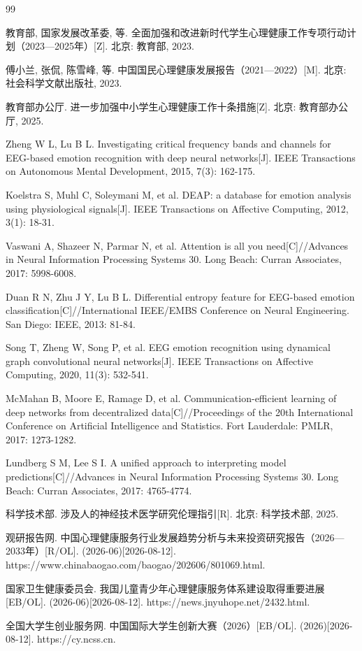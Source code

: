 \documentclass[zihao=-4,fontset=windows,a4paper]{ctexart}
\begin{document}
\begin{thebibliography}{99}

 教育部, 国家发展改革委, 等. 全面加强和改进新时代学生心理健康工作专项行动计划（2023—2025年）[Z]. 北京: 教育部, 2023.

 傅小兰, 张侃, 陈雪峰, 等. 中国国民心理健康发展报告（2021—2022）[M]. 北京: 社会科学文献出版社, 2023.

 教育部办公厅. 进一步加强中小学生心理健康工作十条措施[Z]. 北京: 教育部办公厅, 2025.

 Zheng W L, Lu B L. Investigating critical frequency bands and channels for EEG-based emotion recognition with deep neural networks[J]. IEEE Transactions on Autonomous Mental Development, 2015, 7(3): 162-175.

 Koelstra S, Muhl C, Soleymani M, et al. DEAP: a database for emotion analysis using physiological signals[J]. IEEE Transactions on Affective Computing, 2012, 3(1): 18-31.

 Vaswani A, Shazeer N, Parmar N, et al. Attention is all you need[C]//Advances in Neural Information Processing Systems 30. Long Beach: Curran Associates, 2017: 5998-6008.

 Duan R N, Zhu J Y, Lu B L. Differential entropy feature for EEG-based emotion classification[C]//International IEEE/EMBS Conference on Neural Engineering. San Diego: IEEE, 2013: 81-84.

 Song T, Zheng W, Song P, et al. EEG emotion recognition using dynamical graph convolutional neural networks[J]. IEEE Transactions on Affective Computing, 2020, 11(3): 532-541.

 McMahan B, Moore E, Ramage D, et al. Communication-efficient learning of deep networks from decentralized data[C]//Proceedings of the 20th International Conference on Artificial Intelligence and Statistics. Fort Lauderdale: PMLR, 2017: 1273-1282.

 Lundberg S M, Lee S I. A unified approach to interpreting model predictions[C]//Advances in Neural Information Processing Systems 30. Long Beach: Curran Associates, 2017: 4765-4774.

 科学技术部. 涉及人的神经技术医学研究伦理指引[R]. 北京: 科学技术部, 2025.

 观研报告网. 中国心理健康服务行业发展趋势分析与未来投资研究报告（2026—2033年）[R/OL]. (2026-06)[2026-08-12]. https://www.chinabaogao.com/baogao/202606/801069.html.

 国家卫生健康委员会. 我国儿童青少年心理健康服务体系建设取得重要进展[EB/OL]. (2026-06)[2026-08-12]. https://news.jnyuhope.net/2432.html.

 全国大学生创业服务网. 中国国际大学生创新大赛（2026）[EB/OL]. (2026)[2026-08-12]. https://cy.ncss.cn.

\end{thebibliography}
\end{document}
